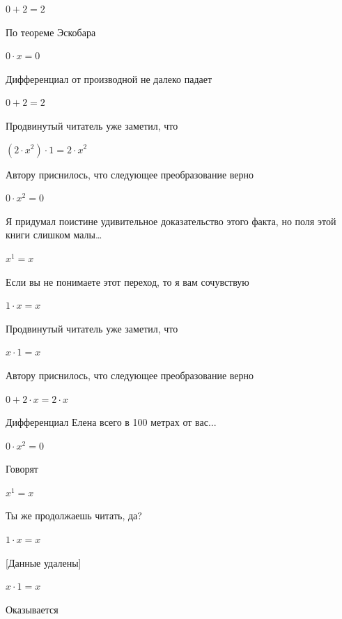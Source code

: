 \documentclass[12pt,a4paper,fleqn]{article}
\begin{document}
\begin{center}
$0+2 = 2$\end{center}
По теореме Эскобара

\begin{center}
$0 \cdot x = 0$\end{center}
Дифференциал от производной не далеко падает\cite{link2}

\begin{center}
$0+2 = 2$\end{center}
Продвинутый читатель уже заметил, что

\begin{center}
$(2 \cdot x^{2}) \cdot 1 = 2 \cdot x^{2}$\end{center}
Автору приснилось, что следующее преобразование верно

\begin{center}
$0 \cdot x^{2} = 0$\end{center}
Я придумал поистине удивительное доказательство этого факта, но поля этой книги слишком малы\ldots

\begin{center}
$x^{1} = x$\end{center}
Если вы не понимаете этот переход, то я вам сочувствую

\begin{center}
$1 \cdot x = x$\end{center}
Продвинутый читатель уже заметил, что

\begin{center}
$x \cdot 1 = x$\end{center}
Автору приснилось, что следующее преобразование верно

\begin{center}
$0+2 \cdot x = 2 \cdot x$\end{center}
Дифференциал Елена всего в 100 метрах от вас...

\begin{center}
$0 \cdot x^{2} = 0$\end{center}
Говорят

\begin{center}
$x^{1} = x$\end{center}
Ты же продолжаешь читать, да?

\begin{center}
$1 \cdot x = x$\end{center}
[Данные удалены]

\begin{center}
$x \cdot 1 = x$\end{center}
Оказывается
\end{document}
